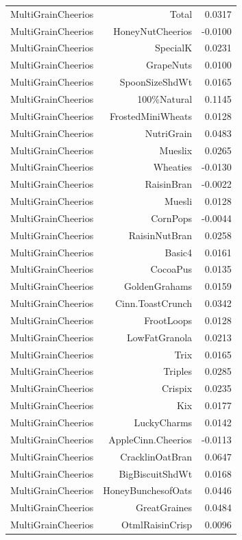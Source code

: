 \begin{longtable}{@{}lrr@{}}
MultiGrainCheerios & Total & 0.0317 \\
MultiGrainCheerios & HoneyNutCheerios & -0.0100 \\
MultiGrainCheerios & SpecialK & 0.0231 \\
MultiGrainCheerios & GrapeNuts & 0.0100 \\
MultiGrainCheerios & SpoonSizeShdWt & 0.0165 \\
MultiGrainCheerios & 100\%Natural & 0.1145 \\
MultiGrainCheerios & FrostedMiniWheats & 0.0128 \\
MultiGrainCheerios & NutriGrain & 0.0483 \\
MultiGrainCheerios & Mueslix & 0.0265 \\
MultiGrainCheerios & Wheaties & -0.0130 \\
MultiGrainCheerios & RaisinBran & -0.0022 \\
MultiGrainCheerios & Muesli & 0.0128 \\
MultiGrainCheerios & CornPops & -0.0044 \\
MultiGrainCheerios & RaisinNutBran & 0.0258 \\
MultiGrainCheerios & Basic4 & 0.0161 \\
MultiGrainCheerios & CocoaPus & 0.0135 \\
MultiGrainCheerios & GoldenGrahams & 0.0159 \\
MultiGrainCheerios & Cinn.ToastCrunch & 0.0342 \\
MultiGrainCheerios & FrootLoops & 0.0128 \\
MultiGrainCheerios & LowFatGranola & 0.0213 \\
MultiGrainCheerios & Trix & 0.0165 \\
MultiGrainCheerios & Triples & 0.0285 \\
MultiGrainCheerios & Crispix & 0.0235 \\
MultiGrainCheerios & Kix & 0.0177 \\
MultiGrainCheerios & LuckyCharms & 0.0142 \\
MultiGrainCheerios & AppleCinn.Cheerios & -0.0113 \\
MultiGrainCheerios & CracklinOatBran & 0.0647 \\
MultiGrainCheerios & BigBiscuitShdWt & 0.0168 \\
MultiGrainCheerios & HoneyBunchesofOats & 0.0446 \\
MultiGrainCheerios & GreatGraines & 0.0484 \\
MultiGrainCheerios & OtmlRaisinCrisp & 0.0096 \\

\end{longtable}
